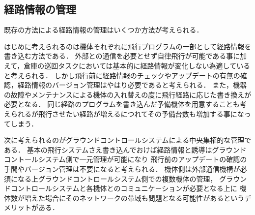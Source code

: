\subsection{経路情報の管理}
\label{route_problem}

既存の方法による経路情報の管理はいくつか方法が考えられる．

はじめに考えられるのは機体それぞれに飛行プログラムの一部として経路情報を書き込む方法である．
外部との通信を必要とせず自律飛行が可能である事に加えて，倉庫の巡回タスクにおいては基本的に経路情報が変化しない為適していると考えられる．
しかし飛行前に経路情報のチェックやアップデートの有無の確認，経路情報のバージョン管理はやはり必要であると考えられる．
また，機器の故障やメンテナンスによる機体の入れ替えの度に飛行経路に応じた書き換えが必要となる．
同じ経路のプログラムを書き込んだ予備機体を用意することも考えられるが飛行させたい経路が増えるにつれてその予備台数も増加する事になってしまう．

次に考えられるのがグラウンドコントロールシステムによる中央集権的な管理である．
基本の飛行システムさえ書き込んでおけば経路情報と誘導はグラウンドコントールシステム側で一元管理が可能になり
飛行前のアップデートの確認の手間やバージョン管理は不要になると考えられる．
機体側は外部通信機構が必須になる上グラウンドコントロールシステム側での複数機体の管理，
グラウンドコントロールシステムと各機体とのコミュニケーションが必要となる上に
機体数が増えた場合にそのネットワークの帯域も問題となる可能性があるというデメリットがある．